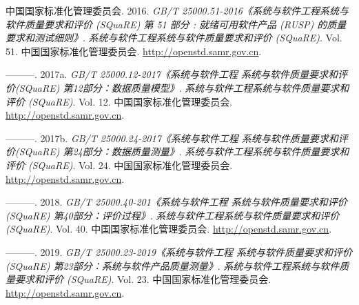 \documentclass[hyperref, a4paper]{ctexart}
\begin{document}
\leavevmode\hypertarget{ref-innovative1}{}%
中国国家标准化管理委员会. 2016. \emph{GB/T
25000.51-2016《系统与软件工程系统与软件质量要求和评价 (SQuaRE) 第 51
部分 : 就绪可用软件产品 (RUSP) 的质量要求和测试细则》}.
\emph{系统与软件工程系统与软件质量要求和评价 (SQuaRE)}. Vol. 51.
中国国家标准化管理委员会. \url{http://openstd.samr.gov.cn}.

\leavevmode\hypertarget{ref-innovative3}{}%
---------. 2017a. \emph{GB/T 25000.12-2017《系统与软件工程
系统与软件质量要求和评价(SQuaRE) 第12部分：数据质量模型》}.
\emph{系统与软件工程系统与软件质量要求和评价 (SQuaRE)}. Vol. 12.
中国国家标准化管理委员会. \url{http://openstd.samr.gov.cn}.

\leavevmode\hypertarget{ref-innovative4}{}%
---------. 2017b. \emph{GB/T 25000.24-2017《系统与软件工程
系统与软件质量要求和评价(SQuaRE) 第24部分：数据质量测量》}.
\emph{系统与软件工程系统与软件质量要求和评价 (SQuaRE)}. Vol. 24.
中国国家标准化管理委员会. \url{http://openstd.samr.gov.cn}.

\leavevmode\hypertarget{ref-innovative5}{}%
---------. 2018. \emph{GB/T 25000.40-201《系统与软件工程
系统与软件质量要求和评价(SQuaRE) 第40部分：评价过程》}.
\emph{系统与软件工程系统与软件质量要求和评价 (SQuaRE)}. Vol. 40.
中国国家标准化管理委员会. \url{http://openstd.samr.gov.cn}.

\leavevmode\hypertarget{ref-innovative2}{}%
---------. 2019. \emph{GB/T 25000.23-2019《系统与软件工程
系统与软件质量要求和评价(SQuaRE) 第23部分：系统与软件产品质量测量》}.
\emph{系统与软件工程系统与软件质量要求和评价 (SQuaRE)}. Vol. 23.
中国国家标准化管理委员会. \url{http://openstd.samr.gov.cn}.
\end{document}
